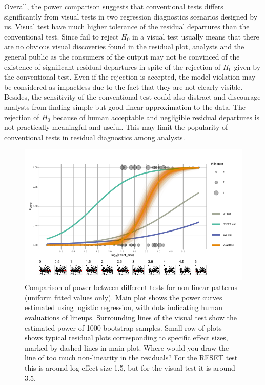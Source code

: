 \documentclass[]{interact}
\theoremstyle{plain}%
\theoremstyle{definition}
\theoremstyle{remark}
\begin{document}
Overall, the power comparison suggests that conventional tests differs
significantly from visual tests in two regression diagnostics scenarios
designed by us. Visual test have much higher tolerance of the residual
departures than the conventional test. Since fail to reject \(H_0\) in a
visual test usually means that there are no obvious visual discoveries
found in the residual plot, analysts and the general public as the
consumers of the output may not be convinced of the existence of
significant residual departures in spite of the rejection of \(H_0\)
given by the conventional test. Even if the rejection is accepted, the
model violation may be considered as impactless due to the fact that
they are not clearly visible. Besides, the sensitivity of the
conventional test could also distract and discourage analysts from
finding simple but good linear approximation to the data. The rejection
of \(H_0\) because of human acceptable and negligible residual
departures is not practically meaningful and useful. This may limit the
popularity of conventional tests in residual diagnostics among analysts.

\begin{figure}

{\centering \includegraphics[width=1\linewidth]{paper_comparison_files/figure-latex/polypower-1} 

}

\caption{Comparison of power between different tests for non-linear patterns (uniform fitted values only). Main plot shows the power curves estimated using logistic regression, with dots indicating human evaluations of lineups. Surrounding lines of the visual test show the estimated power of 1000 bootstrap samples. Small row of plots shows typical residual plots corresponding to specific effect sizes, marked by dashed lines in main plot. Where would you draw the line of too much non-linearity in the residuals? For the RESET test this is around log effect size 1.5, but for the visual test it is around 3.5.}\label{fig:polypower}
\end{figure}
\end{document}
